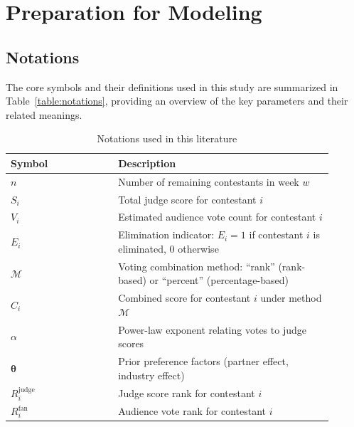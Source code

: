\section{Preparation for Modeling}
\subsection{Notations}
\setlength{\parindent}{2em} %


The core symbols and their definitions used in this study are summarized in Table~\ref{table:notations}, providing an overview of the key parameters and their related meanings.

\begin{table}[ht]
\centering
\caption{Notations used in this literature}
\renewcommand{\arraystretch}{1.5} %
\begin{tabular}{>{\centering\arraybackslash}p{0.3\linewidth} >{\centering\arraybackslash}p{0.6\linewidth}} %
\toprule %
\textbf{Symbol} & \textbf{Description} \\ 
\midrule %

$n$ & Number of remaining contestants in week $w$ \\

$S_i$ & Total judge score for contestant $i$ \\

$V_i$ & Estimated audience vote count for contestant $i$ \\

$E_i$ & Elimination indicator: $E_i = 1$ if contestant $i$ is eliminated, 0 otherwise \\

$\mathcal{M}$ & Voting combination method: ``rank'' (rank-based) or ``percent'' (percentage-based) \\

$C_i$ & Combined score for contestant $i$ under method $\mathcal{M}$ \\

$\alpha$ & Power-law exponent relating votes to judge scores \\

$\boldsymbol{\theta}$ & Prior preference factors (partner effect, industry effect) \\

$R_i^{\text{judge}}$ & Judge score rank for contestant $i$ \\

$R_i^{\text{fan}}$ & Audience vote rank for contestant $i$ \\


\end{tabular}
\end{table}
